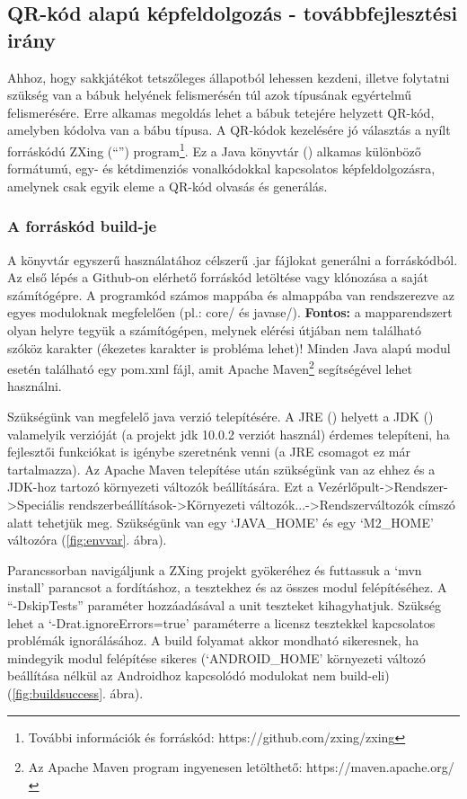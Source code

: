 \documentclass[../documentation.tex]{subfiles}
\begin{document}
\subsection{QR-kód alapú képfeldolgozás - továbbfejlesztési irány} \label{qrsection}
Ahhoz, hogy sakkjátékot tetszőleges állapotból lehessen kezdeni, illetve folytatni szükség van a bábuk helyének felismerésén túl azok típusának egyértelmű felismerésére. Erre alkamas megoldás lehet a bábuk tetejére helyzett QR-kód, amelyben kódolva van a bábu típusa. A QR-kódok kezelésére jó választás a nyílt forráskódú ZXing (``'') program\footnote{További információk és forráskód: https://github.com/zxing/zxing}. Ez a Java könyvtár () alkamas különböző formátumú, egy- és kétdimenziós vonalkódokkal kapcsolatos képfeldolgozásra, amelynek csak egyik eleme a QR-kód olvasás és generálás.

\subsubsection{A forráskód build-je}
A könyvtár egyszerű használatához célszerű .jar fájlokat generálni a forráskódból. Az első lépés a Github-on elérhető forráskód letöltése vagy klónozása a saját számítógépre. A programkód számos mappába és almappába van rendszerezve az egyes moduloknak megfelelően (pl.: core/ és javase/). \textbf{Fontos:} a mapparendszert olyan helyre tegyük a számítógépen, melynek elérési útjában nem található szóköz karakter (ékezetes karakter is probléma lehet)! Minden Java alapú modul esetén található egy pom.xml fájl, amit Apache Maven\footnote{Az Apache Maven program ingyenesen letölthető: https://maven.apache.org/} segítségével lehet használni.

Szükségünk van megfelelő java verzió telepítésére. A JRE () helyett a JDK () valamelyik verzióját (a projekt jdk 10.0.2 verziót használ) érdemes telepíteni, ha fejlesztői funkciókat is igénybe szeretnénk venni (a JRE csomagot ez már tartalmazza). Az Apache Maven telepítése után szükségünk van az ehhez és a JDK-hoz tartozó környezeti változók beállítására. Ezt a Vezérlőpult->Rendszer->Speciális rendszerbeállítások->Környezeti változók...->Rendszerváltozók címszó alatt tehetjük meg. Szükségünk van egy `JAVA\_HOME' és egy `M2\_HOME' változóra (\ref{fig:envvar}. ábra).

Parancssorban navigáljunk a ZXing projekt gyökeréhez és futtassuk a `mvn install' parancsot a fordításhoz, a tesztekhez és az összes modul felépítéséhez. A ``-DskipTests'' paraméter hozzáadásával a unit teszteket kihagyhatjuk. Szükség lehet a `-Drat.ignoreErrors=true' paraméterre a licensz tesztekkel kapcsolatos problémák ignorálásához. A build folyamat akkor mondható sikeresnek, ha mindegyik modul felépítése sikeres (`ANDROID\_HOME' környezeti változó beállítása nélkül az Androidhoz kapcsolódó modulokat nem build-eli) (\ref{fig:buildsuccess}. ábra).
\end{document}
